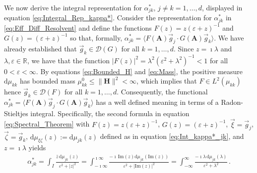 \documentclass[11pt]{amsart}
\renewcommand{\d}{\mathrm{d}}
\newcommand{\Hb}{\mathbf{H}}
\newcommand{\Ab}{\mathbf{A}}
\newcommand{\Qb}{\mathbf{Q}}
\newcommand{\Ds}{\mathscr{D}}
\begin{document}
We now derive the integral representation for $\alpha^*_{jk}$, $j\neq k=1,\ldots,d$,
displayed in equation \eqref{eq:Integral_Rep_kappa*}. Consider the
representation for $\alpha^*_{jk}$ in \eqref{eq:Eff_Diff_Resolvent} and
define the functions $F(z)=z(\varepsilon+z)^{-1}$ and $G(z)=(\varepsilon+z)^{-1}$ so that,
formally, $\alpha^*_{jk}=\langle F(\Ab)\vec{g}_j\cdot G(\Ab)\vec{g}_k\rangle$. We have
already established that $\vec{g}_k\in\Ds(G)$ for all
$k=1,\ldots,d$. Since $z=\imath\lambda$ and $\lambda,\varepsilon\in\mathbb{R}$, we have that the
function $|F(z)|^2=\lambda^2(\varepsilon^2+\lambda^2)^{-1}<1$ for all $0<\varepsilon<\infty$.  By equations
\eqref{eq:Bounded_H} and \eqref{eq:Mass}, the positive measure
$\d\mu_{kk}$ has bounded mass $\mu^0_{kk}\leq\|\Hb\|^2<\infty$, which implies that
$F\in L^2(\mu_{kk})$ hence $\vec{g}_k\in\Ds(F)$ for all
$k=1,\ldots,d$. Consequently, the functional $\alpha^*_{jk}=\langle F(\Ab)\vec{g}_j\cdot
G(\Ab)\vec{g}_k\rangle$ has a well defined 
meaning in terms of a Radon-Stieltjes integral. Specifically, the
second formula in equation \eqref{eq:Spectral_Theorem} with
$F(z)=z(\varepsilon+z)^{-1}$, $G(z)=(\varepsilon+z)^{-1}$, $\vec{\xi}=\vec{g}_j$,
$\vec{\zeta}=\vec{g}_k$, $\d\mu_{\xi\zeta}(z):=\d\mu_{jk}(z)$ defined as in equation
\eqref{eq:Int_kappa*_jk}, 
and $z=\imath\lambda$ yields          
%
\begin{align}\label{eq:Int_alpha*_jk}
  \alpha^*_{jk}
     =\int_I\frac{\overline{z}\,\d\mu_{jk}(z)}{\varepsilon^2+|z|^2}
     =\int_{-\imath\infty}^{\imath\infty}\frac{-\imath\,\text{Im}(z)\d\mu_{jk}(\text{Im}(z))}{\varepsilon^2+|\text{Im}(z)|^2}
     =\int_{-\infty}^\infty\frac{-\imath\lambda\,\d\mu_{jk}(\lambda)}{\varepsilon^2+\lambda^2}\,.
\end{align}
%
\end{document}

